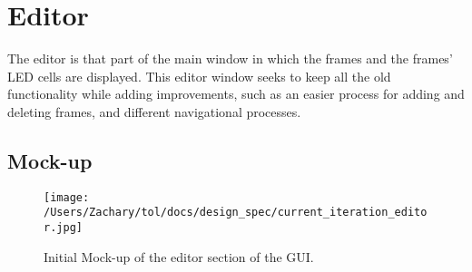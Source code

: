 \documentclass[12pt]{extarticle}
\begin{document}
\clearpage
	\section{Editor}
	The editor is that part of the main window in which the frames and the frames' LED cells are displayed.  This editor window seeks to keep all the old functionality while adding improvements, such as an easier process for adding and deleting frames, and different navigational  processes.
	\subsection{Mock-up}
	\begin{figure}[!htb]
		\texttt{[image: /Users/Zachary/tol/docs/design\_spec/current\_iteration\_editor.jpg]}
		\caption{Initial Mock-up of the editor section of the GUI.}
		\label{fig:editor_view}
	\end{figure}
	
\end{document}
